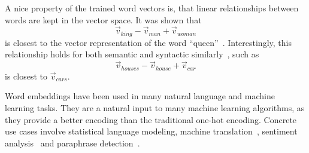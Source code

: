 \documentclass[
        a4paper,
        titlepage,
        twoside,
        parskip,
        numbers=noenddot
        ]{scrbook}
\theoremstyle{break}
\begin{document}
A nice property of the trained word vectors is, that linear relationships between words are kept in the vector space.
It was shown that
\begin{equation}
  \vec{v}_{king} - \vec{v}_{man} + \vec{v}_{woman}
\end{equation}
is closest to the vector representation of the word ``queen''~\cite{Mikolov2013b}.
Interestingly, this relationship holds for both semantic and syntactic similarly~\cite{Mikolov2013a}, such as
\begin{equation}
  \vec{v}_{houses} - \vec{v}_{house} + \vec{v}_{car}
\end{equation}
is closest to $\vec{v}_{cars}$.

Word embeddings have been used in many natural language and machine learning tasks.
They are a natural input to many machine learning algorithms, as they provide a better encoding than the traditional one-hot encoding.
Concrete use cases involve statistical language modeling, machine translation~\cite{Zou2013}, sentiment analysis~\cite{Maas2011} and paraphrase detection~\cite{Mikolov2013a}.


\end{document}
